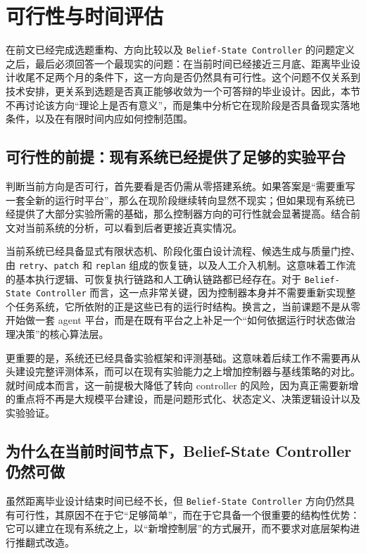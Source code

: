 \section{可行性与时间评估}

在前文已经完成选题重构、方向比较以及 \texttt{Belief-State Controller} 的问题定义之后，最后必须回答一个最现实的问题：在当前时间已经接近三月底、距离毕业设计收尾不足两个月的条件下，这一方向是否仍然具有可行性。这个问题不仅关系到技术安排，更关系到选题是否真正能够收敛为一个可答辩的毕业设计。因此，本节不再讨论该方向“理论上是否有意义”，而是集中分析它在现阶段是否具备现实落地条件，以及在有限时间内应如何控制范围。

\subsection{可行性的前提：现有系统已经提供了足够的实验平台}

判断当前方向是否可行，首先要看是否仍需从零搭建系统。如果答案是“需要重写一套全新的运行时平台”，那么在现阶段继续转向显然不现实；但如果现有系统已经提供了大部分实验所需的基础，那么控制器方向的可行性就会显著提高。结合前文对当前系统的分析，可以看到后者更接近真实情况。

当前系统已经具备显式有限状态机、阶段化蛋白设计流程、候选生成与质量门控、由 \texttt{retry}、\texttt{patch} 和 \texttt{replan} 组成的恢复链，以及人工介入机制。这意味着工作流的基本执行逻辑、可恢复执行链路和人工确认链路都已经存在。对于 \texttt{Belief-State Controller} 而言，这一点非常关键，因为控制器本身并不需要重新实现整个任务系统，它所依附的正是这些已有的运行时结构。换言之，当前课题不是从零开始做一套 agent 平台，而是在既有平台之上补足一个“如何依据运行时状态做治理决策”的核心算法层。

更重要的是，系统还已经具备实验框架和评测基础。这意味着后续工作不需要再从头建设完整评测体系，而可以在现有实验能力之上增加控制器与基线策略的对比。就时间成本而言，这一前提极大降低了转向 controller 的风险，因为真正需要新增的重点将不再是大规模平台建设，而是问题形式化、状态定义、决策逻辑设计以及实验验证。

\subsection{为什么在当前时间节点下，Belief-State Controller 仍然可做}

虽然距离毕业设计结束时间已经不长，但 \texttt{Belief-State Controller} 方向仍然具有可行性，其原因不在于它“足够简单”，而在于它具备一个很重要的结构性优势：它可以建立在现有系统之上，以“新增控制层”的方式展开，而不要求对底层架构进行推翻式改造。

